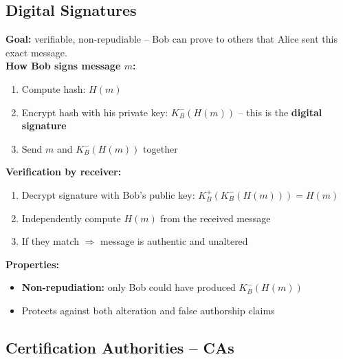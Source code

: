 \subsection{Digital Signatures}

\begin{tcolorbox}[keybox, title=Digital Signatures]
\textbf{Goal:} verifiable, non-repudiable -- Bob can prove to others that Alice sent this exact message.\\[4pt]
\textbf{How Bob signs message $m$:}
\begin{enumerate}[noitemsep]
  \item Compute hash: $H(m)$
  \item Encrypt hash with his private key: $K_B^-(H(m))$ -- this is the \textbf{digital signature}
  \item Send $m$ and $K_B^-(H(m))$ together
\end{enumerate}
\textbf{Verification by receiver:}
\begin{enumerate}[noitemsep]
  \item Decrypt signature with Bob's public key: $K_B^+(K_B^-(H(m))) = H(m)$
  \item Independently compute $H(m)$ from the received message
  \item If they match $\Rightarrow$ message is authentic and unaltered
\end{enumerate}
\textbf{Properties:}
\begin{itemize}[noitemsep]
  \item \textbf{Non-repudiation:} only Bob could have produced $K_B^-(H(m))$
  \item Protects against both alteration and false authorship claims
\end{itemize}
\end{tcolorbox}

\begin{imagebox}
\end{imagebox}

\subsection{Certification Authorities -- CAs}

